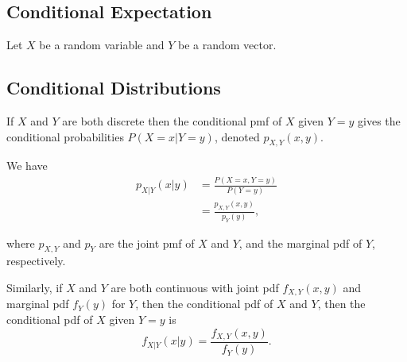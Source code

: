 \subsection{Conditional Expectation} 

Let $X$ be a random variable and $Y $ be a random vector. 

\subsection{Conditional Distributions}

If $X$ and $Y$ are both discrete then the conditional pmf of $X$ given $Y = y$ gives the conditional probabilities $P\left( X = x | Y = y  \right) $, denoted $p_{X,Y}\left( x , y \right) $. 

We have 
\begin{align*}
	p_{X|Y}\left( x | y \right) &= \frac{P\left( X = x , Y = y \right) }{P\left( Y = y \right) } \\
				    &= \frac{p_{X, Y}\left( x, y \right) }{p_{Y}\left( y \right) } 
,\end{align*}

where $p _{X, Y}$ and $p_{Y}$ are the joint pmf of $X$ and $Y$, and the marginal pdf of $Y$,  respectively. 

Similarly, if $X$ and $Y$ are both continuous with joint pdf $f_{X, Y}\left( x, y \right) $ and marginal pdf $f_{Y}\left( y \right) $ for $Y$, then the conditional pdf of $X $ and $Y$, then the conditional pdf of $X$ given $Y = y$ is 
\[
	f_{X|Y}\left( x | y \right) = \frac{f_{X, Y}\left( x, y \right) }{f_{Y}\left( y \right) }
.\] 
